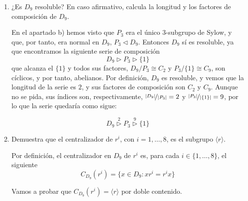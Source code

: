 \documentclass[12pt]{article}
\begin{document}
\begin{ejercicio}
\begin{enumerate}[label=(\alph*)]
            \item ¿Es $D_9$ resoluble? En caso afirmativo, calcula la longitud y los factores de composición de $D_9$.
            
            En el apartado b) hemos visto que $P_3$ era el único $3$-subgrupo de Sylow, y que, por tanto, era normal en $D_9$, $P_3 \vartriangleleft D_9$. Entonces $D_9$ sí es resoluble, ya que encontramos la siguiente serie de composición
            $$D_9 \vartriangleright P_3 \vartriangleright \{1\}$$
            que alcanza el $\{1\}$ y todos sus factores, $D_9 / P_3 \cong C_2$ y $P_3 / \{1\} \cong C_9$, son cíclicos, y por tanto, abelianos. Por definición, $D_9$ es resoluble, y vemos que la longitud de la serie es $2$, y sus factores de composición son $C_2$ y $C_9$. Aunque no se pida, 
            sus índices son, respectivamente, $\nicefrac{|D_9|}{|P_3|} = 2$ y $\nicefrac{|P_3|}{|\{1\}|} = 9$, por lo que la serie quedaría como sigue:

            $$D_9 \stackrel{2}{\vartriangleright} P_3 \stackrel{9}{\vartriangleright} \{1\}$$

            \newpage

            \item Demuestra que el centralizador de $r^i$, con $i = 1,\dots,8$, es el subgrupo $\langle r \rangle$.
            
            Por definición, el centralizador en $D_9$ de $r^i$ es, para cada $i \in \{1, \ldots, 8\}$, el siguiente $$C_{D_9}(r^i) = \{x \in D_9 : xr^i = r^ix\}$$

            Vamos a probar que $C_{D_9}(r^i) = \langle r \rangle$ por doble contenido.


\end{enumerate}
\end{ejercicio}
\end{document}
